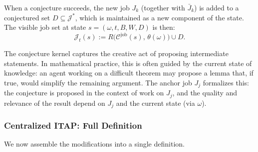 When a conjecture succeeds, the new job $J_k$ (together with $\bar J_k$) is added to
a conjectured set $D \subseteq \mathcal{J}^*$, which is maintained as a new component
of the state. The visible job set at state $s = (\omega, t, B, W, D)$ is then:
\[
\mathcal{J}_t(s) := R\bigl(\mathcal{C}^{\mathrm{job}}(s),\,
\theta(\omega)\bigr) \cup D.
\]

\begin{remark}
The conjecture kernel captures the creative act of proposing intermediate statements.
In mathematical practice, this is often guided by the current state of knowledge: an
agent working on a difficult theorem may propose a lemma that, if true, would simplify
the remaining argument. The anchor job $J_j$ formalizes this: the conjecture is
proposed in the context of work on $J_j$, and the quality and relevance of the result
depend on $J_j$ and the current state (via $\omega$).
\end{remark}

\subsubsection{Centralized ITAP: Full Definition}

We now assemble the modifications into a single definition.

